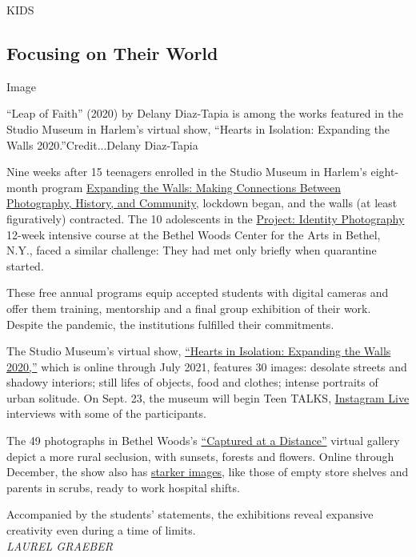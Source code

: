 KIDS

\hypertarget{focusing-on-their-world}{%
\subsection{Focusing on Their World}\label{focusing-on-their-world}}

Image

``Leap of Faith'' (2020) by Delany Diaz-Tapia is among the works
featured in the Studio Museum in Harlem's virtual show, ``Hearts in
Isolation: Expanding the Walls 2020.''Credit...Delany Diaz-Tapia

Nine weeks after 15 teenagers enrolled in the Studio Museum in Harlem's
eight-month program
\href{https://studiomuseum.org/expanding-walls-2020}{Expanding the
Walls: Making Connections Between Photography, History, and Community},
lockdown began, and the walls (at least figuratively) contracted. The 10
adolescents in the
\href{https://www.bethelwoodscenter.org/programs/teens}{Project:
Identity Photography} 12-week intensive course at the Bethel Woods
Center for the Arts in Bethel, N.Y., faced a similar challenge: They had
met only briefly when quarantine started.

These free annual programs equip accepted students with digital cameras
and offer them training, mentorship and a final group exhibition of
their work. Despite the pandemic, the institutions fulfilled their
commitments.

The Studio Museum's virtual show,
\href{https://www.expandingthewalls.studiomuseum.org/exhibition/hearts-in-isolation}{``Hearts
in Isolation: Expanding the Walls 2020,''} which is online through July
2021, features 30 images: desolate streets and shadowy interiors; still
lifes of objects, food and clothes; intense portraits of urban solitude.
On Sept. 23, the museum will begin Teen TALKS,
\href{https://www.instagram.com/studiomuseum/}{Instagram Live}
interviews with some of the participants.

The 49 photographs in Bethel Woods's
\href{https://www.bethelwoodscenter.org/project-identity-photography-virtual-gallery}{``Captured
at a Distance''} virtual gallery depict a more rural seclusion, with
sunsets, forests and flowers. Online through December, the show also has
\href{https://www.bethelwoodscenter.org/project-identity-photography-documenting-health-crisis}{starker
images}, like those of empty store shelves and parents in scrubs, ready
to work hospital shifts.

Accompanied by the students' statements, the exhibitions reveal
expansive creativity even during a time of limits.\\
\emph{LAUREL GRAEBER}

